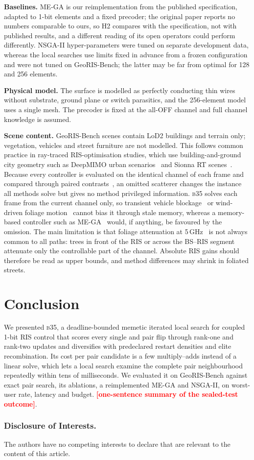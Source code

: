 \documentclass[runningheads]{llncs}
\newif\ifpendshort
\newcommand{\PENDING}[1]{\textcolor{red}{\textbf{\ifpendshort P\else[#1]\fi}}}
\newcommand{\bts}{\textsc{b35}}
\begin{document}
\textbf{Baselines.} ME-GA is our reimplementation from the published specification, adapted to 1-bit elements and a fixed precoder; the original paper reports no numbers comparable to ours, so H2 compares with the specification, not with published results, and a different reading of its open operators could perform differently. NSGA-II hyper-parameters were tuned on separate development data, whereas the local searches use limits fixed in advance from a frozen configuration and were not tuned on GeoRIS-Bench; the latter may be far from optimal for 128 and 256 elements.

\textbf{Physical model.} The surface is modelled as perfectly conducting thin wires without substrate, ground plane or switch parasitics, and the 256-element model uses a single mesh. The precoder is fixed at the all-OFF channel and full channel knowledge is assumed.

\textbf{Scene content.} GeoRIS-Bench scenes contain LoD2 buildings and terrain only; vegetation, vehicles and street furniture are not modelled. This follows common practice in ray-traced RIS-optimisation studies, which use building-and-ground city geometry such as DeepMIMO urban scenarios~\cite{peng2025risnet,alkhateeb2019deepmimo} and Sionna RT scenes~\cite{hoydis2023sionna}. Because every controller is evaluated on the identical channel of each frame and compared through paired contrasts~\cite{glasserman1992crn}, an omitted scatterer changes the instance all methods solve but gives no method privileged information. \bts{} solves each frame from the current channel only, so transient vehicle blockage~\cite{boban2011vehicles,3gpp38901} or wind-driven foliage motion~\cite{pelet2004wind} cannot bias it through stale memory, whereas a memory-based controller such as ME-GA~\cite{zardi2024memory} would, if anything, be favoured by the omission. The main limitation is that foliage attenuation at 5\,GHz~\cite{itu2021p833,alnuaimi1998vegetation} is not always common to all paths: trees in front of the RIS or across the BS--RIS segment attenuate only the controllable part of the channel. Absolute RIS gains should therefore be read as upper bounds, and method differences may shrink in foliated streets.

\section{Conclusion}
We presented \bts{}, a deadline-bounded memetic iterated local search for coupled 1-bit RIS control that scores every single and pair flip through rank-one and rank-two updates and diversifies with predeclared restart densities and elite recombination. Its cost per pair candidate is a few multiply--adds instead of a linear solve, which lets a local search examine the complete pair neighbourhood repeatedly within tens of milliseconds. We evaluated it on GeoRIS-Bench against exact pair search, its ablations, a reimplemented ME-GA and NSGA-II, on worst-user rate, latency and budget. \PENDING{one-sentence summary of the sealed-test outcome}.

\subsubsection*{Disclosure of Interests.} The authors have no competing interests to declare that are relevant to the content of this article.



\end{document}
